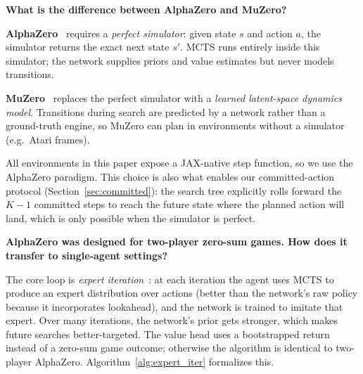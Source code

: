 \documentclass{article}
\begin{document}
\textbf{What is the difference between AlphaZero and MuZero?}

\textbf{AlphaZero}~\cite{silver2018general} requires a \emph{perfect
simulator}: given state $s$ and action $a$, the simulator returns the
exact next state $s'$. MCTS runs entirely inside this simulator; the
network supplies priors and value estimates but never models
transitions.

\textbf{MuZero}~\cite{schrittwieser2020muzero} replaces the perfect
simulator with a \emph{learned latent-space dynamics model}.
Transitions during search are predicted by a network rather than a
ground-truth engine, so MuZero can plan in environments without a
simulator (e.g.\ Atari frames).

All environments in this paper expose a JAX-native step function, so we
use the AlphaZero paradigm. This choice is also what enables our
committed-action protocol (Section~\ref{sec:committed}): the search
tree explicitly rolls forward the $K{-}1$ committed steps to reach the
future state where the planned action will land, which is only possible
when the simulator is perfect.

\textbf{AlphaZero was designed for two-player zero-sum games. How does
it transfer to single-agent settings?}

The core loop is \emph{expert iteration}~\cite{anthony2021expert}: at
each iteration the agent uses MCTS to produce an expert distribution
over actions (better than the network's raw policy because it
incorporates lookahead), and the network is trained to imitate that
expert. Over many iterations, the network's prior gets stronger, which
makes future searches better-targeted. The value head uses a
bootstrapped return instead of a zero-sum game outcome; otherwise the
algorithm is identical to two-player AlphaZero.
Algorithm~\ref{alg:expert_iter} formalizes this.
\end{document}
